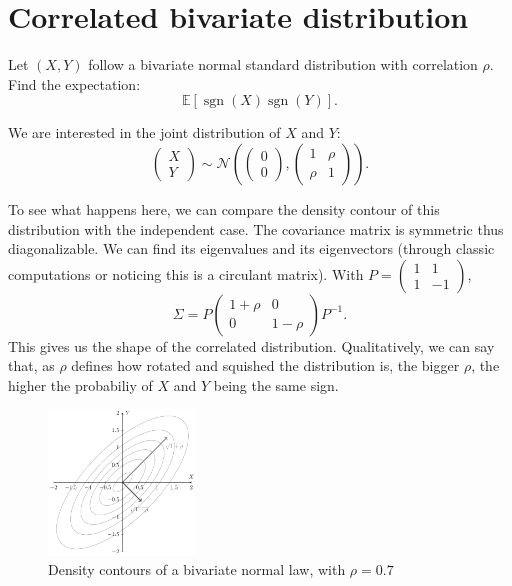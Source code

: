 \section{Correlated bivariate distribution}

\begin{tcolorbox}[width=\linewidth, sharp corners=all, colback=white!95!black]
Let $(X,Y)$ follow a bivariate normal standard distribution with correlation $\rho$. Find the expectation: $$\mathbb{E}[\operatorname{sgn}(X)\operatorname{sgn}(Y)].$$
\end{tcolorbox}

We are interested in the joint distribution of $X$ and $Y$:
$$\begin{pmatrix}X\\Y\end{pmatrix} \sim \mathcal{N}\left(\begin{pmatrix}0\\0\end{pmatrix}, \begin{pmatrix}
1 & \rho\\ \rho & 1
\end{pmatrix}\right).$$

To see what happens here, we can compare the density contour of this distribution with the independent case. The covariance matrix is symmetric thus diagonalizable. We can find its eigenvalues and its eigenvectors (through classic computations or noticing this is a circulant matrix). With $P = \begin{pmatrix}
1 & 1\\ 1 & -1
\end{pmatrix}$,
$$\Sigma = P\begin{pmatrix}
1+\rho & 0\\ 0 & 1-\rho
\end{pmatrix}P^{-1}.$$
This gives us the shape of the correlated distribution. Qualitatively, we can say that, as $\rho$ defines how rotated and squished the distribution is, the bigger $\rho$, the higher the probabiliy of $X$ and $Y$ being the same sign.

\begin{figure}[H]
\includegraphics[width=0.35\textwidth]{img/tikz/bivariate_contour.pdf}
\centering
\caption{Density contours of a bivariate normal law, with $\rho=0.7$}
\label{fig:bivariate_contour}
\end{figure}


